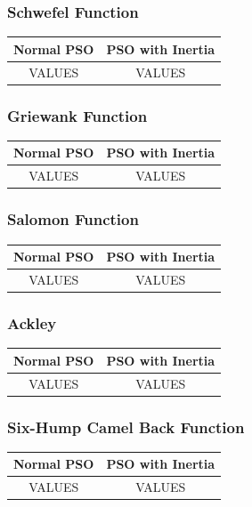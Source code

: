 \subsubsection{Schwefel Function}
\begin{center}
	\begin{tabular}{| c | c |}
	\hline
	Normal PSO & PSO with Inertia \\  \hline
	VALUES & VALUES \\ \hline
	\end{tabular}
\end{center}
\subsubsection{Griewank Function}
\begin{center}
	\begin{tabular}{| c | c |}
	\hline
	Normal PSO & PSO with Inertia \\  \hline
	VALUES & VALUES \\ \hline
	\end{tabular}
\end{center}
\subsubsection{Salomon Function}
\begin{center}
	\begin{tabular}{| c | c |}
	\hline
	Normal PSO & PSO with Inertia \\  \hline
	VALUES & VALUES \\ \hline
	\end{tabular}
\end{center}
\subsubsection{Ackley}
\begin{center}
	\begin{tabular}{| c | c |}
	\hline
	Normal PSO & PSO with Inertia \\  \hline
	VALUES & VALUES \\ \hline
	\end{tabular}
\end{center}
\subsubsection{Six-Hump Camel Back Function}
\begin{center}
	\begin{tabular}{| c | c |}
	\hline
	Normal PSO & PSO with Inertia \\  \hline
	VALUES & VALUES \\ \hline
	\end{tabular}
\end{center}
